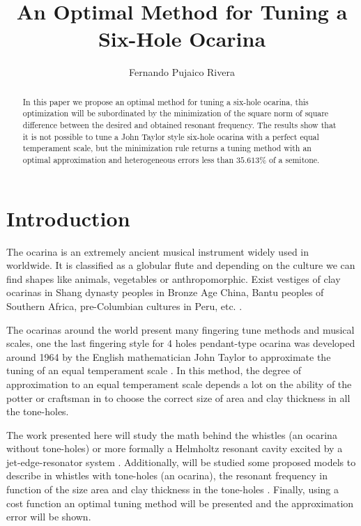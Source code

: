 \documentclass[11pt,twocolumn]{article}
\title{An Optimal Method for Tuning a Six-Hole Ocarina }
\author{Fernando Pujaico Rivera}
\date{ }
\begin{document}
\maketitle


\begin{abstract}
In this paper we propose an optimal method for tuning a six-hole ocarina,
this optimization will be subordinated by the minimization of 
the square norm of square difference between the desired and obtained resonant frequency.
The results show that it is not possible to tune a John Taylor style six-hole ocarina with a perfect equal temperament scale, 
but the minimization rule returns a tuning method with an optimal approximation and heterogeneous errors less than $35.613\%$ of a semitone.
\end{abstract}



\section{Introduction}
The ocarina is an extremely ancient musical instrument widely used in worldwide. 
It is classified as a globular flute and
depending on the culture we can find shapes like animals, vegetables or anthropomorphic.
Exist vestiges of clay ocarinas in 
Shang dynasty peoples in Bronze Age China, 
Bantu peoples of Southern Africa,
pre-Columbian cultures in Peru, etc.
\cite[pp. 589]{apel1969harvard} \cite[pp. 166-168]{sachs2012history} \cite[pp. 31]{leinweber2020art} \cite{rossi2020recuperacion}.

The ocarinas around the world present many fingering tune methods and musical scales,
one the last fingering style for 4 holes pendant-type ocarina was developed around 1964 
by the English mathematician John Taylor 
to approximate the tuning of an equal temperament scale 
\cite[pp. 79]{metropolitan1985american} \cite[pp. 10]{galpin2001newsletter}.
In this method, 
the degree of approximation to an equal temperament scale depends a lot on the ability of the potter or craftsman
in to choose the correct size of area and clay thickness in all the tone-holes.

The work presented here will study the math behind the whistles (an ocarina without tone-holes)  
or more formally a Helmholtz resonant cavity \cite{corning2011resonance} excited by a jet-edge-resonator system \cite[pp. 3]{gibiat2013acoustic} \cite[pp. 138]{nyborg1953characteristics}. 
Additionally, will be studied some proposed models to describe in whistles with tone-holes (an ocarina),
the resonant frequency in function of the size area and  clay thickness in the tone-holes 
\cite{mp2010ocarina} \cite[pp. 44]{cabreraestudio} \cite[pp. 16]{1999air}.
Finally, using a cost function an optimal tuning method will be presented 
and the approximation error will be shown. 
\end{document}

